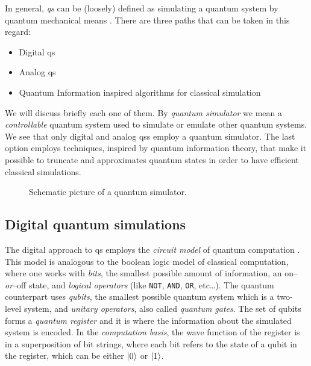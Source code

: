 In general, \emph{\acf{qs}} can be (loosely) defined as simulating a quantum system by quantum mechanical means \cite{georgescu2014simulation}.
There are three paths that can be taken in this regard:
\begin{itemize}
    \item Digital \acl{qs}
    \item Analog \acl{qs}
    \item Quantum Information inspired algorithms for classical simulation
\end{itemize}
We will discuss briefly each one of them.
By \emph{quantum simulator} we mean a \emph{controllable} quantum system used to simulate or emulate other quantum systems.
We see that only digital and analog \ac{qs}s employ a quantum simulator.
The last option employs techniques, inspired by quantum information theory, that make it possible to truncate and approximates quantum states in order to have efficient classical simulations.


\begin{figure}[t]
    \centering
    
    \caption{Schematic picture of a quantum simulator.}
\end{figure}



\subsection{Digital quantum simulations}
\label{sub:digital_quantum_simulations}

The digital approach to \ac{qs} employs the \emph{circuit model} of quantum computation \cite{nielsen2010quantum, deutsch1989quantum}.
This model is analogous to the boolean logic model of classical computation, where one works with \emph{bits}, the smallest possible amount of information, an on--\emph{or}--off state, and \emph{logical operators} (like \texttt{NOT}, \texttt{AND}, \texttt{OR}, etc\dots).
The quantum counterpart uses \emph{qubits}, the smallest possible quantum system which is a two-level system, and \emph{unitary operators}, also called \emph{quantum gates}.
The set of qubits forms a \emph{quantum register} and it is where the information about the simulated system is encoded.
In the \emph{computation basis}, the wave function of the register is in a superposition of bit strings, where each bit refers to the state of a qubit in the register, which can be either $\ket{0}$ or $\ket{1}$.

